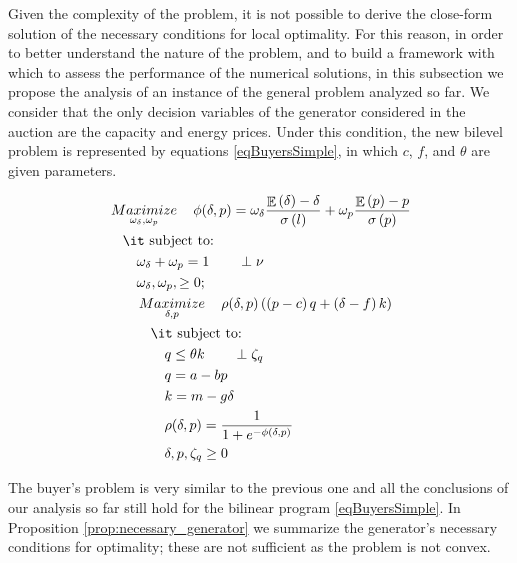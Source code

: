 \documentclass[informs]{informs3}
\begin{document}
Given the complexity of the problem, it is not possible to derive the close-form solution of the necessary conditions for local optimality.  For this reason, in order to better understand the nature of the problem, and to build a framework with which to assess the performance of the numerical solutions, in this subsection we propose the analysis of an instance of the general problem analyzed so far. We consider that the only decision variables of the generator considered in the auction are the capacity and energy prices. Under this condition, the new bilevel problem is represented by equations \ref{eqBuyersSimple}, in which $c$, $f$, and $\theta$ are given parameters.

\begin{subequations}\label{eqBuyersSimple}
	\begin{align}
	&\mathop {Maximize}\limits_{\omega_{\delta},\omega_{p}}
	\quad \phi(\delta, p) =  	 \omega_{\delta}\frac{\mathop{\mathbb{E}}\left(\delta\right)-\delta }
	{\sigma\left(l\right)}+\omega_{p}\frac{\mathop{\mathbb{E}}\left(p\right)-p}  {\sigma\left(p\right)}  \label{eqBuyerObjectiveSimple}\\
	&\quad \mbox{{\it subject to}:}\notag\\
	&\qquad	 \omega_{\delta}+\omega_{p}=1\label{eqBuyerNormalSimple} \qquad \perp \nu\\
	&\qquad  \omega_{\delta},\omega_{p}, \geq 0;\\		
	&\qquad \mathop {Maximize}\limits_{\delta, p}
	\quad \rho(\delta,p)\left(\left(p-c\right)q+\left(\delta-f\right)k\right) \label{eqGeneratorObjectiveSimple}\\ 
	&\qquad \quad \mbox{{\it subject to}:}\notag\\
	&\qquad \qquad q \leq \theta k	\label{eqBuyerEnergySupplySimple} 	\qquad \perp \zeta_q\\
	&\qquad \qquad q = a - bp \label{eqBuyerEnergyDemandSimple}\\	
	&\qquad \qquad k = m -g \delta \label{eqBuyerCapacityDemandSimple}\\
	&\qquad	\qquad \rho(\delta, p)=\frac{1}{1+e^{-\phi(\delta, p)}} \label{eqGeneratorProbabilitySimple}\\
	&\qquad \qquad  \delta, p, \zeta_q\geq 0 \label{eqGeneratorNon-NegativeSimple}
	\end{align}
\end{subequations}

The buyer's problem is very similar to the previous one and all the conclusions of our analysis so far still hold for the bilinear program \ref{eqBuyersSimple}. In Proposition \ref{prop:necessary_generator} we summarize the generator's necessary conditions for optimality; these are not sufficient as the problem is not convex.
\end{document}
